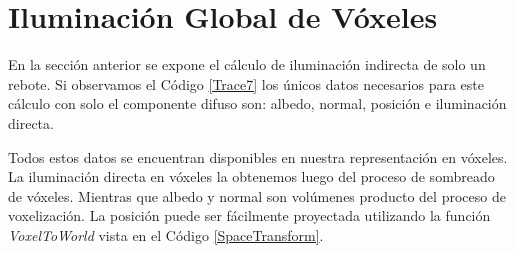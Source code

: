 \section{Iluminación Global de Vóxeles} %
\label{sec:iluminacion_global_de_voxeles_impl}
En la sección anterior se expone el cálculo de iluminación indirecta de solo un rebote. Si observamos el Código \ref{Trace7} los únicos datos necesarios para este cálculo con solo el componente difuso son: albedo, normal, posición e iluminación directa.

Todos estos datos se encuentran disponibles en nuestra representación en vóxeles. La iluminación directa en vóxeles la obtenemos luego del proceso de sombreado de vóxeles. Mientras que albedo y normal son volúmenes producto del proceso de voxelización. La posición puede ser fácilmente proyectada utilizando la función \emph{VoxelToWorld} vista en el Código \ref{SpaceTransform}.

